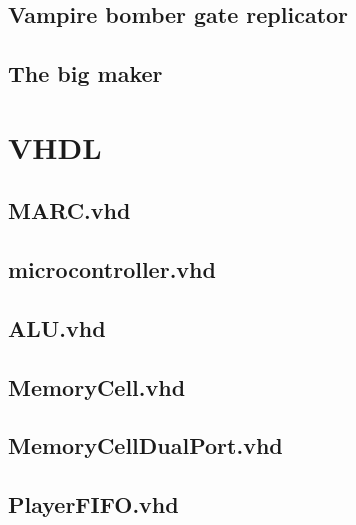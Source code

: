 \documentclass[11pt]{article}
\begin{document}
\subsection{Vampire bomber gate replicator}


\subsection{The big maker}



\newpage
\section{VHDL}

\subsection{MARC.vhd}


\newpage
\subsection{microcontroller.vhd}


\newpage
\subsection{ALU.vhd}


\newpage
\subsection{MemoryCell.vhd}


\newpage
\subsection{MemoryCellDualPort.vhd}



\newpage
\subsection{PlayerFIFO.vhd}

\end{document}
